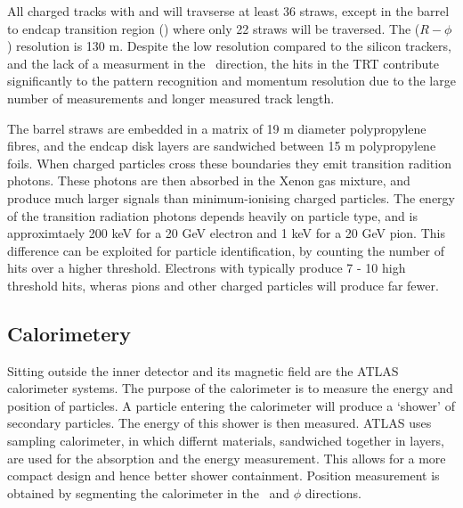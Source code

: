 All charged tracks with  and  will travserse at least 36
straws, except in the barrel to endcap transition region ()
where only 22 straws will be traversed. The ($R-\phi$) resolution is 130 \micro
m. Despite the low resolution compared to the silicon trackers, and the lack of
a measurment in the \z\ direction, the hits in the TRT contribute significantly
to the pattern recognition and momentum resolution due to the large number of
measurements and longer measured track length.

The barrel straws are embedded in a matrix of 19 \micro m diameter polypropylene
fibres, and the endcap disk layers are sandwiched between 15 \micro m
polypropylene foils. When charged particles cross these boundaries they emit
transition radition photons. These photons are then absorbed in the Xenon gas
mixture, and produce much larger signals than minimum-ionising
charged particles. The energy of the transition radiation photons depends
heavily on particle type, and is approximtaely 200 keV for a 20 GeV electron and
1 keV for a 20 GeV pion. This difference can be exploited for particle
identification, by counting the number of hits over a higher threshold.
Electrons with  typically produce 7 - 10 high threshold hits, wheras
pions and other charged particles will produce far fewer.

\subsection{Calorimetery}

Sitting outside the inner detector and its magnetic field are the ATLAS
calorimeter systems. The purpose of the calorimeter is to measure the energy and
position of particles. A particle entering the calorimeter will produce a
`shower' of secondary particles. The energy of this shower is then measured.
ATLAS uses sampling calorimeter, in which differnt materials, sandwiched
together in layers, are used for the absorption and the energy measurement. This
allows for a more compact design and hence better shower containment. Position
measurement is obtained by segmenting the calorimeter in the \z\ and $\phi$
directions.

